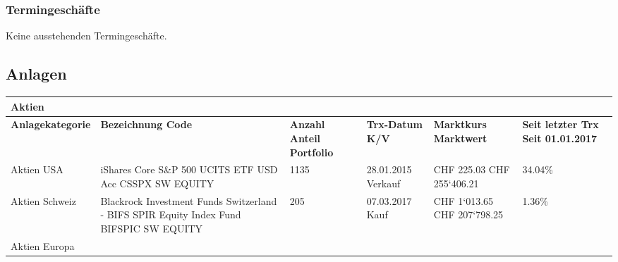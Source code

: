 \documentclass[9pt,landscape,a4paper]{report}
\begin{document}
\subsubsection{Termingeschäfte}

Keine ausstehenden Termingeschäfte.

\newpage
 \subsection{Anlagen}

\footnotesize \renewcommand*{\arraystretch}{1.5}

\begin{longtable}{L{5.5cm} L{5.5cm} R{2.5cm} R{2.5cm} R{2.5cm} R{3cm}}
\normalsize \bf{Aktien} \small \newline  & & & & & \\ \toprule[1pt] \bf{Anlagekategorie} \newline \bf{} & \bf{Bezeichnung} \newline \bf{Code} & \bf{Anzahl} \newline \bf{Anteil Portfolio} & \bf{Trx-Datum} \newline \bf{K/V} & \bf{Marktkurs} \newline \bf{Marktwert} & \bf{Seit letzter Trx} \newline \bf{Seit 01.01.2017} \\ \toprule[1pt] \endhead  Aktien USA \newline & iShares Core S{\&}P 500 UCITS ETF USD Acc \newline CSSPX SW EQUITY \newline  & 1135  & 28.01.2015 \newline Verkauf & CHF  225.03 \newline CHF 255`406.21 & 34.04{\%}  \\ \hline  {}  Aktien Schweiz \newline & Blackrock Investment Funds Switzerland - BIFS SPIR Equity Index Fund \newline BIFSPIC SW EQUITY \newline  & 205  & 07.03.2017 \newline Kauf & CHF  1`013.65 \newline CHF 207`798.25 & 1.36{\%}  \\ \hline Aktien Europa 
\end{longtable}
\end{document}
